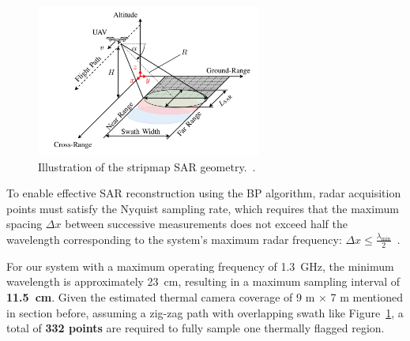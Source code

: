 \begin{figure}[H]
    \centering
    \includegraphics[height=5cm]{figs/Huirui/gpr_swath}
    \caption{Illustration of the stripmap SAR geometry.~\cite{schartel2018uav}.}
    \label{fig:swath_geometry}
\end{figure}

To enable effective SAR reconstruction using the BP algorithm, radar acquisition points must satisfy the Nyquist sampling rate, which requires that the maximum spacing $\Delta x$ between successive measurements does not exceed half the wavelength corresponding to the system's maximum radar frequency: \(\Delta x \leq \frac{\lambda_{\text{min}}}{2}\)~\cite{9758040}.

For our system with a maximum operating frequency of 1.3~GHz, the minimum wavelength is approximately 23~cm, resulting in a maximum sampling interval of \textbf{11.5~cm}. Given the estimated thermal camera coverage of 9 m × 7 m mentioned in section before, assuming a zig-zag path with overlapping swath like Figure~\ref{fig:swath_geometry}, a total of \textbf{332 points} are required to fully sample one thermally flagged region. 